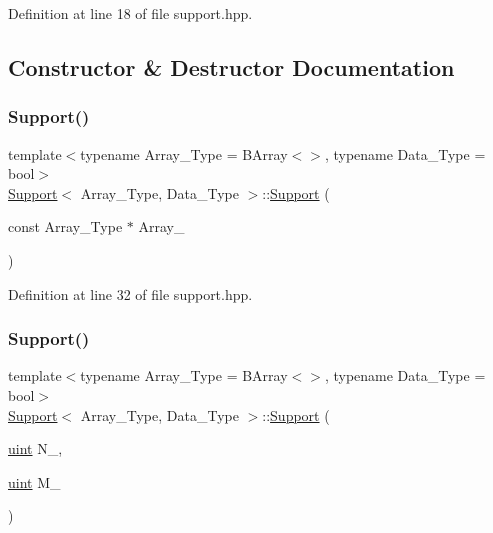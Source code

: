 Definition at line 18 of file support.\+hpp.



\subsection{Constructor \& Destructor Documentation}
\mbox{\label{class_support_a4a0587bc6f1f268005a94fea039ea6ba}} 
\subsubsection{\texorpdfstring{Support()}{Support()}\hspace{0.1cm}{\footnotesize\ttfamily [1/2]}}
{\footnotesize\ttfamily template$<$typename Array\+\_\+\+Type  = B\+Array$<$$>$, typename Data\+\_\+\+Type  = bool$>$ \\
\hyperlink{class_support}{Support}$<$ Array\+\_\+\+Type, Data\+\_\+\+Type $>$\+::\hyperlink{class_support}{Support} (\begin{DoxyParamCaption}\item[{const Array\+\_\+\+Type $\ast$}]{Array\+\_\+ }\end{DoxyParamCaption})\hspace{0.3cm}{\ttfamily [inline]}}



Definition at line 32 of file support.\+hpp.

\mbox{\label{class_support_aff7d2705d6f765fcbd8958453b7dbefe}} 
\subsubsection{\texorpdfstring{Support()}{Support()}\hspace{0.1cm}{\footnotesize\ttfamily [2/2]}}
{\footnotesize\ttfamily template$<$typename Array\+\_\+\+Type  = B\+Array$<$$>$, typename Data\+\_\+\+Type  = bool$>$ \\
\hyperlink{class_support}{Support}$<$ Array\+\_\+\+Type, Data\+\_\+\+Type $>$\+::\hyperlink{class_support}{Support} (\begin{DoxyParamCaption}\item[{\hyperlink{typedefs_8hpp_a91ad9478d81a7aaf2593e8d9c3d06a14}{uint}}]{N\+\_\+,  }\item[{\hyperlink{typedefs_8hpp_a91ad9478d81a7aaf2593e8d9c3d06a14}{uint}}]{M\+\_\+ }\end{DoxyParamCaption})\hspace{0.3cm}{\ttfamily [inline]}}



